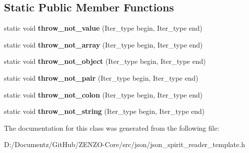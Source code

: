 \subsection*{Static Public Member Functions}
\begin{DoxyCompactItemize}
\item 
\mbox{\label{classjson__spirit_1_1_json__grammer_a1227fb5b6bcd501b6d05d7e9cceee02b}} 
static void {\bfseries throw\+\_\+not\+\_\+value} (Iter\+\_\+type begin, Iter\+\_\+type end)
\item 
\mbox{\label{classjson__spirit_1_1_json__grammer_ac64bb4d2e31662e43ef613ae52bfacfa}} 
static void {\bfseries throw\+\_\+not\+\_\+array} (Iter\+\_\+type begin, Iter\+\_\+type end)
\item 
\mbox{\label{classjson__spirit_1_1_json__grammer_af243428007c7698e3d0a004c56986e30}} 
static void {\bfseries throw\+\_\+not\+\_\+object} (Iter\+\_\+type begin, Iter\+\_\+type end)
\item 
\mbox{\label{classjson__spirit_1_1_json__grammer_ab3c938c81f4bb25ec28c8f2d8fb9deb3}} 
static void {\bfseries throw\+\_\+not\+\_\+pair} (Iter\+\_\+type begin, Iter\+\_\+type end)
\item 
\mbox{\label{classjson__spirit_1_1_json__grammer_aba1fb3ab7a896435c92abf353e120d49}} 
static void {\bfseries throw\+\_\+not\+\_\+colon} (Iter\+\_\+type begin, Iter\+\_\+type end)
\item 
\mbox{\label{classjson__spirit_1_1_json__grammer_a3697b8b95612a64914f7118af86a08c4}} 
static void {\bfseries throw\+\_\+not\+\_\+string} (Iter\+\_\+type begin, Iter\+\_\+type end)
\end{DoxyCompactItemize}


The documentation for this class was generated from the following file\+:\begin{DoxyCompactItemize}
\item 
D\+:/\+Documentz/\+Git\+Hub/\+Z\+E\+N\+Z\+O-\/\+Core/src/json/json\+\_\+spirit\+\_\+reader\+\_\+template.\+h\end{DoxyCompactItemize}
